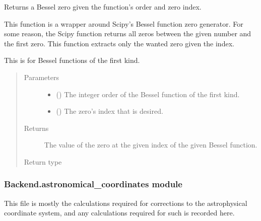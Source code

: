 \documentclass[letterpaper,10pt,english]{sphinxmanual}
\begin{document}

\begin{fulllineitems}
\label{\detokenize{Backend.Ewertowski_Basu_2013:Backend.Ewertowski_Basu_2013.bessel_zeros}}
Returns a Bessel zero given the function’s order and zero index.

This function is a wrapper around Scipy’s Bessel function zero generator.
For some reason, the Scipy function returns all zeros between the given
number and the first zero. This function extracts only the wanted zero
given the index.

This is for Bessel functions of the first kind.
\begin{quote}\begin{description}
\item[{Parameters}] \leavevmode\begin{itemize}
\item {} 
 () \textendash{} The integer order of the Bessel function of the first kind.

\item {} 
 () \textendash{} The zero’s index that is desired.

\end{itemize}

\item[{Returns}] \leavevmode
{} \textendash{} The value of the zero at the given index of the given Bessel function.

\item[{Return type}] \leavevmode
{}

\end{description}\end{quote}

\end{fulllineitems}



\subsubsection{Backend.astronomical\_coordinates module}
\label{\detokenize{Backend.astronomical_coordinates:module-Backend.astronomical_coordinates}}\label{\detokenize{Backend.astronomical_coordinates:backend-astronomical-coordinates-module}}\label{\detokenize{Backend.astronomical_coordinates::doc}}
This file is mostly the calculations required for corrections to the
astrophysical coordinate system, and any calculations required for such is
recorded here.
\end{document}

